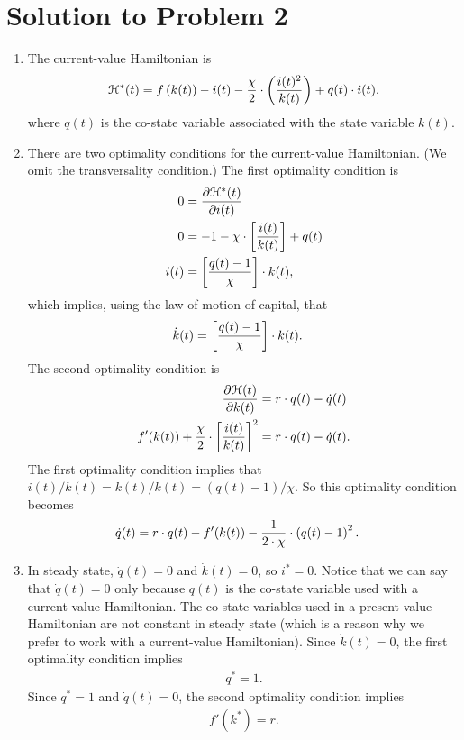 \documentclass[letterpaper,12pt,leqno]{article}
\begin{document}
\section*{Solution to Problem 2}

\begin{enumerate}
\item The current-value Hamiltonian is
\begin{align*}
\mathcal{H}^{*}(t)=f\left( k(t) \right)-i(t)-\frac{\chi}{2}\cdot \left( \frac{i(t)^{2}}{k(t)} \right)+q(t)\cdot i(t), 
\end{align*}
where $q(t)$ is the co-state variable associated with the state variable $k(t)$.
\item There are two optimality conditions for the current-value Hamiltonian. (We omit the transversality condition.) The first optimality condition is
\begin{align*}
0&=\frac{\partial \mathcal{H}^{*}(t)}{\partial i(t)} \\
0&=-1-\chi \cdot \left[ \frac{i(t)}{k(t)} \right]+q(t) \\
i(t)&=\left[ \frac{q(t)-1}{\chi} \right]\cdot k(t),
\end{align*}
which implies, using the law of motion of capital, that
\begin{align*}
\dot{k}(t)&=\left[ \frac{q(t)-1}{\chi} \right]\cdot k(t).
\end{align*}
The second optimality condition is
\begin{align*}
\frac{\partial \mathcal{H}(t)}{\partial k(t)} &=r\cdot q(t)-\dot{q}(t)\\
f'(k(t)) +\frac{\chi}{2}\cdot \left[ \frac{i(t)}{k(t)} \right]^{2}&=r\cdot q(t)-\dot{q}(t).
\end{align*}
The first optimality condition implies that $i(t)/k(t)=\dot{k}(t)/k(t)=(q(t)-1)/\chi$. So this optimality condition becomes
\begin{align*}
\dot{q}(t)&=r\cdot q(t)-f'(k(t))-\frac{1}{2\cdot \chi}\cdot \left( q(t)-1 \right)^{2}.
\end{align*}
\item In steady state, $\dot{q}(t)=0$ and $\dot{k}(t)=0$, so $i^{*}=0$. Notice that we can say that $\dot{q}(t)=0$ only because $q(t)$ is the co-state variable used with a current-value Hamiltonian. The co-state variables used in a present-value Hamiltonian are not constant in steady state (which is a reason why we prefer to work with a current-value Hamiltonian). Since $\dot{k}(t)=0$, the first optimality condition implies
\begin{align*}
q^{*}=1.
\end{align*}
Since $q^{*}=1$ and $\dot{q}(t)=0$, the second optimality condition implies
\begin{align*} 
f'(k^{*})=r.
\end{align*}
\end{enumerate}
\end{document}
